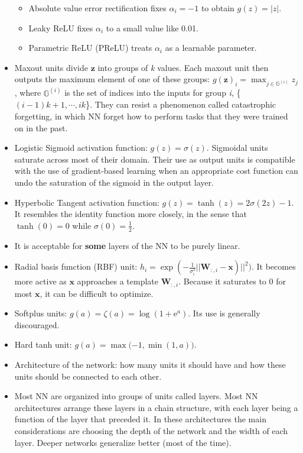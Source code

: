 \documentclass{article}
\begin{document}
\begin{itemize}
\begin{itemize}
\item Absolute value error rectification fixes \(\alpha_i = -1\) to obtain \(g(z) = |z|\).
\item Leaky ReLU fixes \(\alpha_i\) to a small value like 0.01.
\item Parametric ReLU (PReLU) treats \(\alpha_i\) as a learnable parameter.
\end{itemize}
\item Maxout units divide \(\boldsymbol{z}\) into groups of \textit{k} values. Each maxout unit then outputs the maximum element of one of these groups: \(g(\boldsymbol{z})_i = \max_{j \in \mathbb{G}^{(i)}}{z_j}\), where \(\mathbb{G}^{(i)}\) is the set of indices into the inputs for group \textit{i}, \{\((i-1)k+1,\cdots, ik\)\}. They can resist a phenomenon called catastrophic forgetting, in which NN forget how to perform tasks that they were trained on in the past.
\item Logistic Sigmoid activation function: \(g(z) = \sigma (z)\). Sigmoidal units saturate across most of their domain. Their use as output units is compatible with the use of gradient-based learning when an appropriate cost function can undo the saturation of the sigmoid in the output layer.
\item Hyperbolic Tangent activation function: \(g(z) = \tanh{(z)} = 2\sigma (2z) - 1\). It resembles the identity function more closely, in the sense that \(\tanh (0) = 0\) while \(\sigma (0) = \frac{1}{2}\).
\item It is acceptable for \textbf{some} layers of the NN to be purely linear.
\item Radial basis function (RBF) unit: \(h_i = \exp{(-\frac{1}{\sigma^2_i}||\boldsymbol{W}_{:,i} - \boldsymbol{x})||^2})\). It becomes more active as \(\boldsymbol{x}\) approaches a template \(\boldsymbol{W}_{:,i}\). Because it saturates to 0 for most \(\boldsymbol{x}\), it can be difficult to optimize.
\item Softplus units: \(g(a) = \zeta (a) = \log{(1 + \mathrm{e}^{a})}\). Its use is generally discouraged.
\item Hard tanh unit: \(g(a) = \max{(-1, \min{(1, a))}}\).
\item Architecture of the network: how many units it should have and how these units should be connected to each other.
\item Most NN are organized into groups of units called layers. Most NN architectures arrange these layers in a chain structure, with each layer being a function of the layer that preceded it. In these architectures the main considerations are choosing the depth of the network and the width of each layer. Deeper networks generalize better (most of the time).

\end{itemize}
\end{document}
